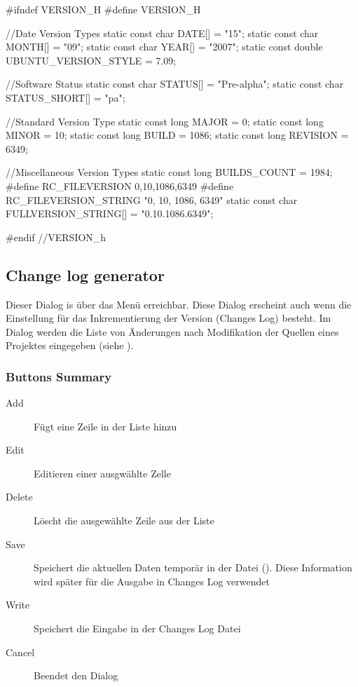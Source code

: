 \begin{code}
#ifndef VERSION_H
#define VERSION_H

	//Date Version Types
	static const char DATE[] = "15";
	static const char MONTH[] = "09";
	static const char YEAR[] = "2007";
	static const double UBUNTU_VERSION_STYLE = 7.09;

	//Software Status
	static const char STATUS[] = "Pre-alpha";
	static const char STATUS_SHORT[] = "pa";

	//Standard Version Type
	static const long MAJOR = 0;
	static const long MINOR = 10;
	static const long BUILD = 1086;
	static const long REVISION = 6349;

	//Miscellaneous Version Types
	static const long BUILDS_COUNT = 1984;
	#define RC_FILEVERSION 0,10,1086,6349
	#define RC_FILEVERSION_STRING "0, 10, 1086, 6349\0"
	static const char FULLVERSION_STRING[] = "0.10.1086.6349";

#endif //VERSION_h
\end{code}

\subsection{Change log generator}

Dieser Dialog is über das Menü  erreichbar. Diese Dialog erscheint auch wenn die Einstellung  für das Inkrementierung der Version (Changes Log) besteht. Im Dialog werden die Liste von Änderungen nach Modifikation der Quellen eines Projektes eingegeben (siehe ).


\subsubsection{Buttons Summary}

\begin{description}
\item[Add] Fügt eine Zeile in der Liste hinzu
\item[Edit] Editieren einer ausgwählte Zelle
\item[Delete] Löscht die ausgewählte Zeile aus der Liste
\item[Save] Speichert die aktuellen Daten temporär in der Datei (). Diese Information wird später für die Ausgabe in Changes Log verwendet
\item[Write] Speichert die Eingabe in der Changes Log Datei
\item[Cancel] Beendet den Dialog
\end{description}

